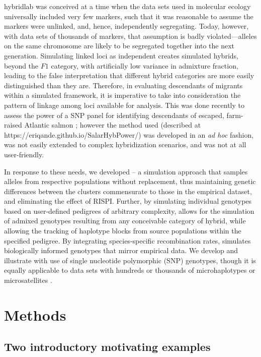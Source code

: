 {\sc hybridlab} was conceived at a time when
the data sets used in molecular ecology universally included very few markers, such that
it was reasonable to assume the markers were unlinked, and, hence, independently segregating.
Today, however, with data sets of thousands of markers, that assumption is badly violated---alleles
on the same chromosome are likely to be segregated together into the next generation.
Simulating linked loci as independent creates simulated hybrids, beyond the $F1$ category, with 
artificially low variance in admixture fraction, leading to the false interpretation that different
hybrid categories are more easily distinguished than they are. Therefore, in evaluating descendants of migrants within a simulated framework, it is imperative to take into consideration the pattern of
linkage among loci available for analysis. This was done recently to assess the power of a SNP panel for identifying descendants of escaped, farm-raised Atlantic salmon \citep{wringe2019development}; however the method used (described at https://eriqande.github.io/SalarHybPower/) was developed in an {\em ad hoc} fashion, was not easily extended to
complex hybridization scenarios, and was not at all user-friendly.

In response to these needs, we developed \gscramble{} – a simulation approach that samples alleles from respective populations without
replacement, thus maintaining genetic differences between the clusters commensurate to those in the empirical dataset, and eliminating the effect of RISPI.
Further, by simulating individual genotypes based on user-defined pedigrees of arbitrary complexity, \gscramble{} allows for the simulation of admixed genotypes resulting from any conceivable category of hybrid, while allowing the tracking of haplotype blocks from source populations within the specified pedigree.
By integrating species-specific recombination rates, \gscramble{} simulates biologically informed genotypes that mirror empirical data.
We develop and illustrate \gscramble{} with use of single nucleotide polymorphic (SNP) genotypes, though it is equally applicable to data sets with hundreds or thousands of
microhaplotypes \citep{baetscher2018microhaplotypes} or microsatellites
\citep{zhan2017megasat}.




\section*{Methods}

\subsection*{Two introductory motivating examples}


